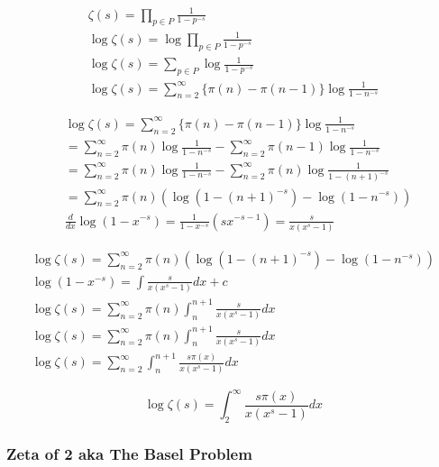 	$$
	\begin{gathered}
		\zeta(s)=\prod_{p \in P} \frac{1}{1-p^{-s}} \\
		\log \zeta(s)=\log \prod_{p \in P} \frac{1}{1-p^{-s}} \\
		\log \zeta(s)=\sum_{p \in P} \log \frac{1}{1-p^{-s}} \\
		\log \zeta(s)=\sum_{n=2}^{\infty}\{\pi(n)-\pi(n-1)\} \log \frac{1}{1-n^{-s}}
	\end{gathered}
	$$
	
	$$
	\begin{aligned}
		& \log \zeta(s)=\sum_{n=2}^{\infty}\{\pi(n)-\pi(n-1)\} \log \frac{1}{1-n^{-s}} \\
		& =\sum_{n=2}^{\infty} \pi(n) \log \frac{1}{1-n^{-s}}-\sum_{n=2}^{\infty} \pi(n-1) \log \frac{1}{1-n^{-s}} \\
		& =\sum_{n=2}^{\infty} \pi(n) \log \frac{1}{1-n^{-s}}-\sum_{n=2}^{\infty} \pi(n) \log \frac{1}{1-(n+1)^{-s}} \\
		& =\sum_{n=2}^{\infty} \pi(n)\left(\log \left(1-(n+1)^{-s}\right)-\log \left(1-n^{-s}\right)\right) \\
		& \frac{d}{d x} \log \left(1-x^{-s}\right)=\frac{1}{1-x^{-s}}\left(s x^{-s-1}\right)=\frac{s}{x\left(x^s-1\right)}
	\end{aligned}
	$$
	
	$$
	\begin{gathered}
		\log \zeta(s)=\sum_{n=2}^{\infty} \pi(n)\left(\log \left(1-(n+1)^{-s}\right)-\log \left(1-n^{-s}\right)\right) \\
		\log \left(1-x^{-s}\right)=\int \frac{s}{x\left(x^s-1\right)} d x+c \\
		\log \zeta(s)=\sum_{n=2}^{\infty} \pi(n) \int_n^{n+1} \frac{s}{x\left(x^s-1\right)} d x \\
		\log \zeta(s)=\sum_{n=2}^{\infty} \pi(n) \int_n^{n+1} \frac{s}{x\left(x^s-1\right)} d x \\
		\log \zeta(s)=\sum_{n=2}^{\infty} \int_n^{n+1} \frac{s \pi(x)}{x\left(x^s-1\right)} d x
	\end{gathered}
	$$
	
	$$
	\log \zeta(s)=\int_2^{\infty} \frac{s \pi(x)}{x\left(x^s-1\right)} d x
	$$
	
	\subsubsection{Zeta of 2 aka The Basel Problem}
	
